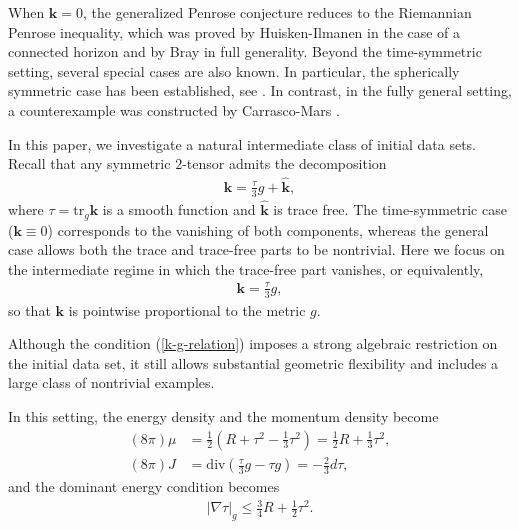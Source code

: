 \documentclass[11pt, letterpaper]{amsart}
\theoremstyle{definition}
\theoremstyle{remark}
\begin{document}
When $\mathbf{k}=0$, the generalized Penrose conjecture reduces to the Riemannian Penrose inequality, which was proved by Huisken-Ilmanen \cite{HI01} in the case of a connected horizon and by Bray \cite{Bray01} in full generality. Beyond the time-symmetric setting, several special cases are also known. In particular, the spherically symmetric case has been established, see \cite{Hayward96, IMM96, BrayKhuri10Jang}. In contrast, in the fully general setting, a counterexample was constructed by Carrasco-Mars \cite{CarrascoMars10}.





In this paper, we investigate a natural intermediate class of initial data sets. Recall that any symmetric $2$-tensor admits the decomposition 
\begin{align*}
	\mathbf{k} = \frac{\tau }{3} g + \hat{\mathbf{k}},
\end{align*} 
where $\tau = \mathrm{tr}_{g} \mathbf{k}$ is a smooth function and $\hat{\mathbf{k}}$ is trace free. The time-symmetric case ($\mathbf{k}\equiv 0$) corresponds to the vanishing of both components, whereas the general case allows both the trace and trace-free parts to be nontrivial. Here we focus on the intermediate regime in which the trace-free part vanishes, or equivalently, 
\begin{align}\label{k-g-relation}
	\mathbf{k} = \frac{\tau }{3} g,
\end{align}
so that $\mathbf{k}$ is pointwise proportional to the metric $g$.

Although the condition (\ref{k-g-relation}) imposes a strong algebraic restriction on the initial data set, it still allows substantial geometric flexibility and includes a large class of nontrivial examples.

In this setting, the energy density and the momentum density become
\begin{align*}
	(8 \pi) \mu &= \frac{1}{2}\left( R + \tau ^2 - \frac{1}{3} \tau ^2 \right) = \frac{1}{2}R + \frac{1}{3} \tau ^2,\\
	(8 \pi) J &=  \mathrm{div}\left( \frac{\tau }{3} g - \tau g\right)  = -\frac{2}{3} d \tau,
\end{align*} 
and the dominant energy condition becomes 
\begin{align}\label{DEC-tau}
	|\nabla \tau |_g \leq \frac{3}{4} R + \frac{1}{2} \tau ^2.
\end{align} 
\end{document}

